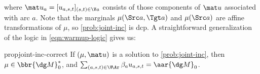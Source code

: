 where $\mat u_a = [u_{a,s,t}]_{(s,t) \in \V a}$ consists of those
components of $\mat u$ associated with arc $a$.
%
Note that
the marginals
 $\mu(\Src a, \Tgt a)$ and $\mu(\Src a)$ 
are affine transformations of $\mu$, so \eqref{prob:joint-inc} is dcp.
A straightforward generalization of the logic in \eqref{eqn:warmup-logic} gives us:

\begin{linked}{prop}{joint-inc-correct}
    If $(\mu, \mat u)$ is a solution to \eqref{prob:joint-inc}, then
    $\mu \in \bbr{\dg M}_0^*$,
    and
    $%
        \sum_{(a,s,t) \in \V\!\Ar} \beta_a u_{a,s,t} = \aar{\dg M}_0$.
\end{linked}

